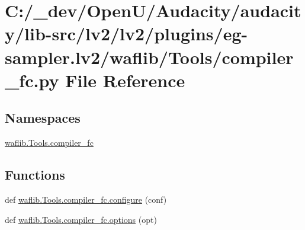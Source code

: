\hypertarget{lv2_2plugins_2eg-sampler_8lv2_2waflib_2_tools_2compiler__fc_8py}{}\section{C\+:/\+\_\+dev/\+Open\+U/\+Audacity/audacity/lib-\/src/lv2/lv2/plugins/eg-\/sampler.lv2/waflib/\+Tools/compiler\+\_\+fc.py File Reference}
\label{lv2_2plugins_2eg-sampler_8lv2_2waflib_2_tools_2compiler__fc_8py}
\subsection*{Namespaces}
\begin{DoxyCompactItemize}
\item 
 \hyperlink{namespacewaflib_1_1_tools_1_1compiler__fc}{waflib.\+Tools.\+compiler\+\_\+fc}
\end{DoxyCompactItemize}
\subsection*{Functions}
\begin{DoxyCompactItemize}
\item 
def \hyperlink{namespacewaflib_1_1_tools_1_1compiler__fc_afb0080302700edcb49f41f58f40aed12}{waflib.\+Tools.\+compiler\+\_\+fc.\+configure} (conf)
\item 
def \hyperlink{namespacewaflib_1_1_tools_1_1compiler__fc_ad760dedba1ba7a9aa7cfd119667484cd}{waflib.\+Tools.\+compiler\+\_\+fc.\+options} (opt)
\end{DoxyCompactItemize}
